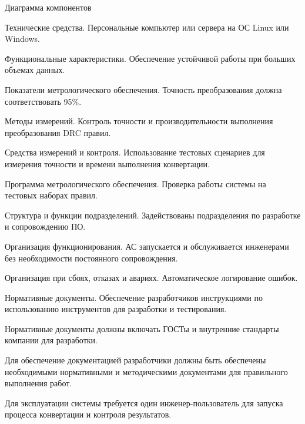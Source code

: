 \begin{image}
	\caption{Диаграмма компонентов}
	\label{fig:c4:components}
\end{image}


Технические средства.
Персональные компьютер или сервера на ОС Linux или Windows.

Функциональные характеристики.
Обеспечение устойчивой работы при больших объемах данных.


Показатели метрологического обеспечения.
Точность преобразования должна соответствовать 95\%.

Методы измерений.
Контроль точности и производительности выполнения преобразования DRC правил.

Средства измерений и контроля.
Использование тестовых сценариев для измерения точности
и времени выполнения конвертации.

Программа метрологического обеспечения.
Проверка работы системы на тестовых наборах правил.


Структура и функции подразделений.
Задействованы подразделения по разработке и сопровождению ПО.

Организация функционирования.
АС запускается и обслуживается инженерами
без необходимости постоянного сопровождения.

Организация при сбоях, отказах и авариях.
Автоматическое логирование ошибок.

Нормативные документы.
Обеспечение разработчиков инструкциями по использованию инструментов
для разработки и тестирования.


Нормативные документы должны включать
ГОСТы и внутренние стандарты компании для разработки.

Для обеспечение документацией разработчики
должны быть обеспечены необходимыми нормативными
и методическими документами для правильного выполнения работ.



Для эксплуатации системы требуется один инженер-пользователь
для запуска процесса конвертации и контроля результатов.

